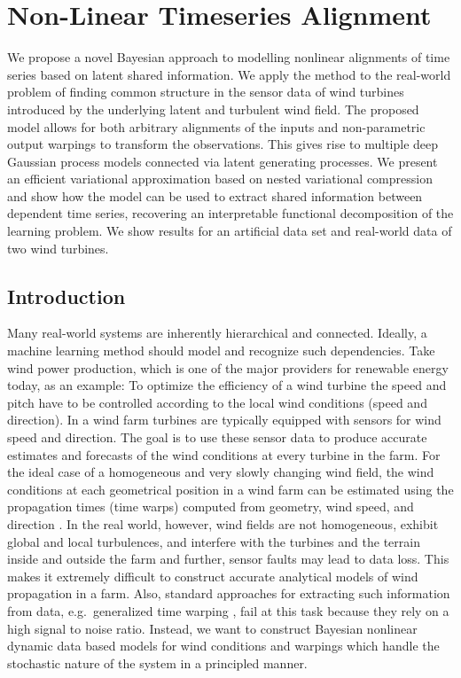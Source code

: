 \section{Non-Linear Timeseries Alignment}
\label{sec:timeseries_alignment:non_linear_timeseries_alignment}
We propose a novel Bayesian approach to modelling nonlinear alignments of time series based on latent shared information.
We apply the method to the real-world problem of finding common structure in the sensor data of wind turbines introduced by the underlying latent and turbulent wind field.
The proposed model allows for both arbitrary alignments of the inputs and non-parametric output warpings to transform the observations.
This gives rise to multiple deep Gaussian process models connected via latent generating processes.
We present an efficient variational approximation based on nested variational compression and show how the model can be used to extract shared information between dependent time series, recovering an interpretable functional decomposition of the learning problem.
We show results for an artificial data set and real-world data of two wind turbines.


\subsection{Introduction}
Many real-world systems are inherently hierarchical and connected.
Ideally, a machine learning method should model and recognize such dependencies.
Take wind power production, which is one of the major providers for renewable energy today, as an example:
To optimize the efficiency of a wind turbine the speed and pitch have to be controlled according to the local wind conditions (speed and direction).
In a wind farm turbines are typically equipped with sensors for wind speed and direction.
The goal is to use these sensor data to produce accurate estimates and forecasts of the wind conditions at every turbine in the farm.
For the ideal case of a homogeneous and very slowly changing wind field, the wind conditions at each geometrical position in a wind farm can be estimated using the propagation times (time warps) computed from geometry, wind speed, and direction \parencite{soleimanzadeh_controller_2011,bitar_coordinated_2013,schepers_improved_2007}.
In the real world, however, wind fields are not homogeneous, exhibit global and local turbulences, and interfere with the turbines and the terrain inside and outside the farm and further, sensor faults may lead to data loss.
This makes it extremely difficult to construct accurate analytical models of wind propagation in a farm.
Also, standard approaches for extracting such information from data, e.g.\ generalized time warping  \parencite{zhou_generalized_2012}, fail at this task because they rely on a high signal to noise ratio.
Instead, we want to construct Bayesian nonlinear dynamic data based models for wind conditions and warpings which handle the stochastic nature of the system in a principled manner.

